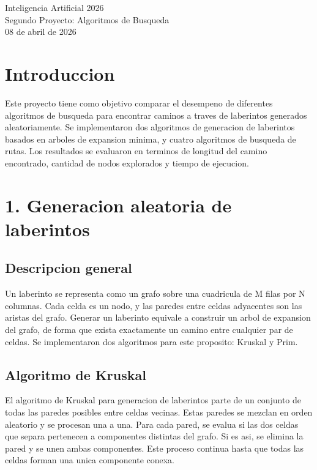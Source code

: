 \documentclass[12pt]{article}
\begin{document}
\begin{center}
  {\large Inteligencia Artificial 2026} \\[4pt]
  {\large Segundo Proyecto: Algoritmos de Busqueda} \\[4pt]
  {\normalsize 08 de abril de 2026}
\end{center}

\vspace{10pt}

\section{Introduccion}

Este proyecto tiene como objetivo comparar el desempeno de diferentes algoritmos de busqueda para encontrar caminos a traves de laberintos generados aleatoriamente. Se implementaron dos algoritmos de generacion de laberintos basados en arboles de expansion minima, y cuatro algoritmos de busqueda de rutas. Los resultados se evaluaron en terminos de longitud del camino encontrado, cantidad de nodos explorados y tiempo de ejecucion.

\section{1. Generacion aleatoria de laberintos}

\subsection{Descripcion general}

Un laberinto se representa como un grafo sobre una cuadricula de M filas por N columnas. Cada celda es un nodo, y las paredes entre celdas adyacentes son las aristas del grafo. Generar un laberinto equivale a construir un arbol de expansion del grafo, de forma que exista exactamente un camino entre cualquier par de celdas. Se implementaron dos algoritmos para este proposito: Kruskal y Prim.

\subsection{Algoritmo de Kruskal}

El algoritmo de Kruskal para generacion de laberintos parte de un conjunto de todas las paredes posibles entre celdas vecinas. Estas paredes se mezclan en orden aleatorio y se procesan una a una. Para cada pared, se evalua si las dos celdas que separa pertenecen a componentes distintas del grafo. Si es asi, se elimina la pared y se unen ambas componentes. Este proceso continua hasta que todas las celdas forman una unica componente conexa.
\end{document}
